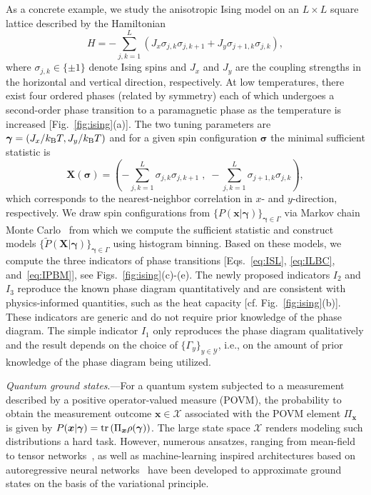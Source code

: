 \documentclass[twocolumn,aps,prl,superscriptaddress,tightlines,nofootinbib]{revtex4-2}
\begin{document}
\indent As a concrete example, we study the anisotropic Ising model on an $L \times L$ square lattice described by the Hamiltonian
\begin{equation}\label{eq:ising_hamiltonian}
H= -\sum_{j,k=1}^L  \left( J_x \sigma_{j,k} \sigma_{j, k+1} + J_y \sigma_{j+1,k} \sigma_{j, k} \right),
\end{equation}
where $\sigma_{j,k} \in \{ \pm 1\}$ denote Ising spins and $J_x$ and $J_y$ are the coupling strengths in the horizontal and vertical direction, respectively. At low temperatures, there exist four ordered phases (related by symmetry) each of which undergoes a second-order phase transition to a paramagnetic phase as the temperature is increased [Fig.~\ref{fig:ising}(a)]. The two tuning parameters are $\bm{\gamma} = \left( J_x/k_{\rm B}T, J_y/k_{\rm B}T \right)$ and for a given spin configuration $\bm{\sigma}$ the minimal sufficient statistic is
\begin{equation*}
    \bm{X}(\bm{\sigma}) = \left( -\sum_{j,k=1}^L \sigma_{j,k} \sigma_{j, k+1}\;,\; -\sum_{j,k=1}^L \sigma_{j+1,k} \sigma_{j, k} \right),
\end{equation*}
which corresponds to the nearest-neighbor correlation in $x$- and $y$-direction, respectively. We draw spin configurations from $\{ P(\bm{x}|\bm{\gamma})\}_{\bm{\gamma} \in \Gamma}$ via Markov chain Monte Carlo~\cite{suppl} from which we compute the sufficient statistic and construct models $\{ \tilde{P}(\bm{X}|\bm{\gamma})\}_{\bm{\gamma} \in \Gamma}$ using histogram binning. Based on these models, we compute the three indicators of phase transitions [Eqs.~\eqref{eq:ISL}, \eqref{eq:ILBC}, and~\eqref{eq:IPBM}], see Figs.~\ref{fig:ising}(c)-(e). The newly proposed indicators $I_{2}$ and $I_{3}$ reproduce the known phase diagram quantitatively and are consistent with physics-informed quantities, such as the heat capacity [cf. Fig.~\ref{fig:ising}(b)]. These indicators are generic and do not require prior knowledge of the phase diagram. The simple indicator $I_{1}$ only reproduces the phase diagram qualitatively and the result depends on the choice of $\{\Gamma_{y}\}_{y\in \mathcal{Y}}$, i.e., on the amount of prior knowledge of the phase diagram being utilized.

\indent \emph{Quantum ground states}.---For a quantum system subjected to a measurement described by a positive operator-valued measure (POVM), the probability to obtain the measurement outcome $\bm{x} \in \mathcal{X}$ associated with the POVM element $\Pi_{\bm{x}}$ is given by $P(\bm{x}|\bm{\gamma}) = {\rm tr}\left(\Pi_{\bm{x}} \rho(\bm{\gamma})\right)$. The large state space $\mathcal{X}$ renders modeling such distributions a hard task. However, numerous ansatzes, ranging from mean-field to tensor networks~\cite{schollwock:2011}, as well as machine-learning inspired architectures based on autoregressive neural networks~\cite{sharir:2020,hibat:2020} have been developed to approximate ground states on the basis of the variational principle. 
\end{document}
